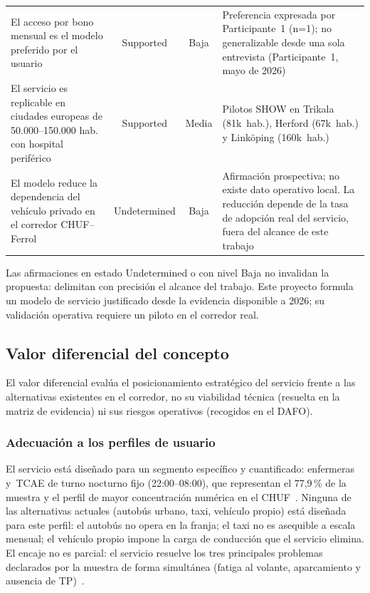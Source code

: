 \begin{table}[htbp]
\begin{tabularx}{\textwidth}{p{5.2cm} c c p{4.8cm}}
El acceso por bono mensual es el modelo preferido por
el usuario &
Supported & Baja &
Preferencia expresada por Participante~1 (n=1); no
generalizable desde una sola entrevista
(Participante~1, mayo de 2026) \\
\addlinespace

El servicio es replicable en ciudades europeas de
50.000--150.000 hab. con hospital periférico &
Supported & Media &
Pilotos SHOW en Trikala (81k~hab.), Herford (67k~hab.)
y Linköping (160k~hab.)~\parencite{SHOW2024Legacy,
URBACTNight2024} \\
\addlinespace

El modelo reduce la dependencia del vehículo privado
en el corredor \acs{CHUF}--Ferrol &
Undetermined & Baja &
Afirmación prospectiva; no existe dato operativo local.
La reducción depende de la tasa de adopción real del
servicio, fuera del alcance de este trabajo \\

\bottomrule
\end{tabularx}
\end{table}

Las afirmaciones en estado Undetermined o con nivel Baja
no invalidan la propuesta: delimitan con precisión el alcance
del trabajo. Este proyecto formula un modelo de servicio
justificado desde la evidencia disponible a 2026; su validación
operativa requiere un piloto en el corredor real.

\subsection{Valor diferencial del concepto}
\label{sec:valor-diferencial}

El valor diferencial evalúa el posicionamiento estratégico del
servicio frente a las alternativas existentes en el corredor,
no su viabilidad técnica (resuelta en la matriz de evidencia)
ni sus riesgos operativos (recogidos en el \acs{DAFO}).

\subsubsection{Adecuación a los perfiles de usuario}

El servicio está diseñado para un segmento específico y
cuantificado: enfermeras y~\acs{TCAE} de turno nocturno fijo
(22:00--08:00), que representan el 77,9\,\% de la muestra y el
perfil de mayor concentración numérica en el
\acs{CHUF}~\parencite{LouridoRegueira2026}. Ninguna de las
alternativas actuales (autobús urbano, taxi, vehículo propio)
está diseñada para este perfil: el autobús no opera en la
franja; el taxi no es asequible a escala mensual; el vehículo
propio impone la carga de conducción que el servicio elimina.
El encaje no es parcial: el servicio resuelve los tres
principales problemas declarados por la muestra de forma
simultánea (fatiga al volante, aparcamiento y ausencia de
\acs{TP})~\parencite{LouridoRegueira2026}.

